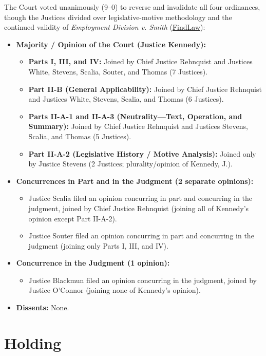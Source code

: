 \documentclass[12pt]{article}
\begin{document}
The Court voted unanimously (9--0) to reverse and invalidate all four ordinances, though the Justices divided over legislative-motive methodology and the continued validity of \textit{Employment Division v. Smith} (\href{https://caselaw.findlaw.com/court/us-supreme-court/508/520.html}{FindLaw}):

\begin{itemize}
  \item \textbf{Majority / Opinion of the Court (Justice Kennedy):}
  \begin{itemize}
    \item \textbf{Parts I, III, and IV:} Joined by Chief Justice Rehnquist and Justices White, Stevens, Scalia, Souter, and Thomas (7 Justices).
    \item \textbf{Part II-B (General Applicability):} Joined by Chief Justice Rehnquist and Justices White, Stevens, Scalia, and Thomas (6 Justices).
    \item \textbf{Parts II-A-1 and II-A-3 (Neutrality---Text, Operation, and Summary):} Joined by Chief Justice Rehnquist and Justices Stevens, Scalia, and Thomas (5 Justices).
    \item \textbf{Part II-A-2 (Legislative History / Motive Analysis):} Joined only by Justice Stevens (2 Justices; plurality/opinion of Kennedy, J.).
  \end{itemize}
  \item \textbf{Concurrences in Part and in the Judgment (2 separate opinions):}
  \begin{itemize}
    \item Justice Scalia filed an opinion concurring in part and concurring in the judgment, joined by Chief Justice Rehnquist (joining all of Kennedy's opinion except Part II-A-2).
    \item Justice Souter filed an opinion concurring in part and concurring in the judgment (joining only Parts I, III, and IV).
  \end{itemize}
  \item \textbf{Concurrence in the Judgment (1 opinion):}
  \begin{itemize}
    \item Justice Blackmun filed an opinion concurring in the judgment, joined by Justice O'Connor (joining none of Kennedy's opinion).
  \end{itemize}
  \item \textbf{Dissents:} None.
\end{itemize}

\section{Holding}
\end{document}
